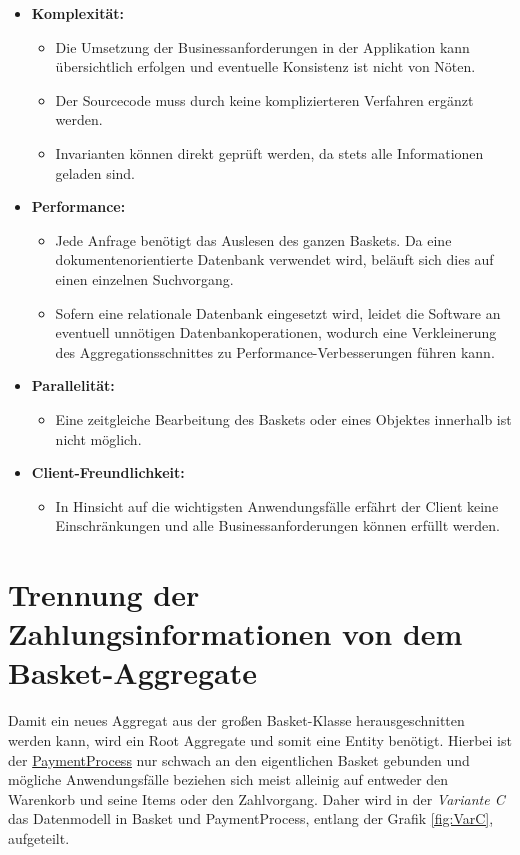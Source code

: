 \begin{itemize}[noitemsep,nolistsep,topsep=-2pt]
	\item \textbf{Komplexität: } {
		\begin{itemize}
			\item {Die Umsetzung der Businessanforderungen in der Applikation kann übersichtlich erfolgen und eventuelle Konsistenz ist nicht von Nöten. }
			\item {Der Sourcecode muss durch keine komplizierteren Verfahren ergänzt werden.}
			\item {Invarianten können direkt geprüft werden, da stets alle Informationen geladen sind. }
		\end{itemize}
	}
	\item \textbf{Performance: } {
		\begin{itemize}
			\item Jede Anfrage benötigt das Auslesen des ganzen Baskets. Da eine dokumentenorientierte Datenbank verwendet wird, beläuft sich dies auf einen einzelnen Suchvorgang.
			\item Sofern eine relationale Datenbank eingesetzt wird, leidet die Software an eventuell unnötigen Datenbankoperationen, wodurch eine Verkleinerung des Aggregationsschnittes zu Performance-Verbesserungen führen kann.
		\end{itemize}
	}
	\item \textbf{Parallelität: } {
		\begin{itemize}
			\item Eine zeitgleiche Bearbeitung des Baskets oder eines Objektes innerhalb ist nicht möglich.
		\end{itemize}	
	}
	\item \textbf{Client-Freundlichkeit: } {
		\begin{itemize}
			\item In Hinsicht auf die wichtigsten Anwendungsfälle erfährt der Client keine Einschränkungen und alle Businessanforderungen können erfüllt werden.
		\end{itemize}
	}
\end{itemize}


\section{Trennung der Zahlungsinformationen von dem Basket-Aggregate}

Damit ein neues Aggregat aus der großen Basket-Klasse herausgeschnitten werden kann, wird ein Root Aggregate und somit eine Entity benötigt. Hierbei ist der \ul{PaymentProcess} nur schwach an den eigentlichen Basket gebunden und mögliche Anwendungsfälle beziehen sich meist alleinig auf entweder den Warenkorb und seine Items oder den Zahlvorgang. Daher wird in der \emph{Variante C} das Datenmodell in Basket und PaymentProcess, entlang der Grafik \ref{fig:VarC}, aufgeteilt. 

